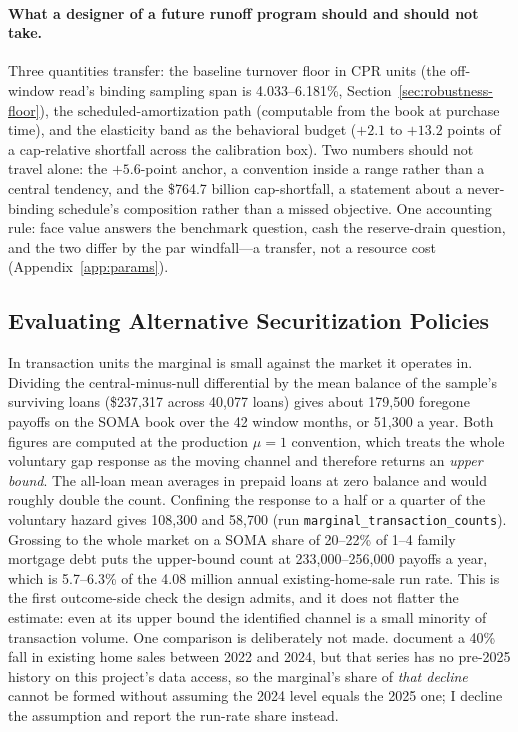 \documentclass[12pt]{article}
\begin{document}
\paragraph{What a designer of a future runoff program should and should not take.} Three quantities transfer: the baseline turnover floor in CPR units (the off-window read's binding sampling span is 4.033--6.181\%, Section~\ref{sec:robustness-floor}), the scheduled-amortization path (computable from the book at purchase time), and the elasticity band as the behavioral budget ($+2.1$ to $+13.2$ points of a cap-relative shortfall across the calibration box). Two numbers should not travel alone: the $+5.6$-point anchor, a convention inside a range rather than a central tendency, and the \$764.7 billion cap-shortfall, a statement about a never-binding schedule's composition rather than a missed objective. One accounting rule: face value answers the benchmark question, cash the reserve-drain question, and the two differ by the par windfall---a transfer, not a resource cost (Appendix~\ref{app:params}).

\subsection{Evaluating Alternative Securitization Policies}\label{sec:discussion-policy}
In transaction units the marginal is small against the market it operates in. Dividing the central-minus-null differential by the mean balance of the sample's surviving loans (\$237{,}317 across 40{,}077 loans) gives about 179{,}500 foregone payoffs on the SOMA book over the 42 window months, or 51{,}300 a year. Both figures are computed at the production $\mu = 1$ convention, which treats the whole voluntary gap response as the moving channel and therefore returns an \emph{upper bound}. The all-loan mean averages in prepaid loans at zero balance and would roughly double the count. Confining the response to a half or a quarter of the voluntary hazard gives 108{,}300 and 58{,}700 (run \texttt{marginal\_transaction\_counts}). Grossing to the whole market on a SOMA share of 20--22\% of 1--4 family mortgage debt puts the upper-bound count at 233{,}000--256{,}000 payoffs a year, which is 5.7--6.3\% of the 4.08 million annual existing-home-sale run rate. This is the first outcome-side check the design admits, and it does not flatter the estimate: even at its upper bound the identified channel is a small minority of transaction volume. One comparison is deliberately not made. \citet{fonseca2026} document a 40\% fall in existing home sales between 2022 and 2024, but that series has no pre-2025 history on this project's data access, so the marginal's share of \emph{that decline} cannot be formed without assuming the 2024 level equals the 2025 one; I decline the assumption and report the run-rate share instead.
\end{document}
